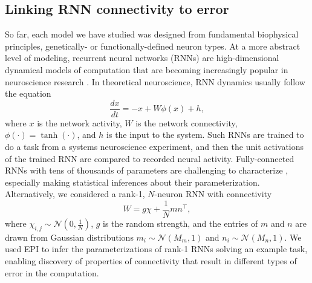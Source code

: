 \documentclass[11pt]{article}
\begin{document}
\subsection{Linking RNN connectivity to error} \label{results_RNN}
So far, each model we have studied was designed from fundamental biophysical principles, genetically- or functionally-defined neuron types.  
At a more abstract level of modeling, recurrent neural networks (RNNs) are high-dimensional dynamical models of computation that are becoming increasingly popular in neuroscience research \cite{barak2017recurrent}. 
In theoretical neuroscience, RNN dynamics usually follow the equation
\begin{equation}
\frac{dx}{dt} = -x + W \phi(x) + h,
\end{equation}
where $x$ is the network activity, $W$ is the network connectivity, $\phi(\cdot) = \tanh(\cdot)$, and $h$ is the input to the system.
Such RNNs are trained to do a task from a systems neuroscience experiment, and then the unit activations of the trained RNN are compared to recorded neural activity.
Fully-connected RNNs with tens of thousands of parameters are challenging to characterize \cite{sussillo2013opening}, especially making statistical inferences about their parameterization.
Alternatively, we considered a rank-1, $N$-neuron RNN with connectivity
\begin{equation}
W = g\chi + \frac{1}{N}mn^\top,
\end{equation}
where $\chi_{i,j} \sim \mathcal{N}(0, \frac{1}{N})$, $g$ is the random strength, and the entries of $m$ and $n$ are drawn from Gaussian distributions $m_i \sim \mathcal{N}(M_m, 1)$ and $n_i \sim \mathcal{N}(M_n, 1)$.  
We used EPI to infer the parameterizations of rank-1 RNNs solving an example task, enabling discovery of properties of connectivity that result in different types of error in the computation.
\end{document}
